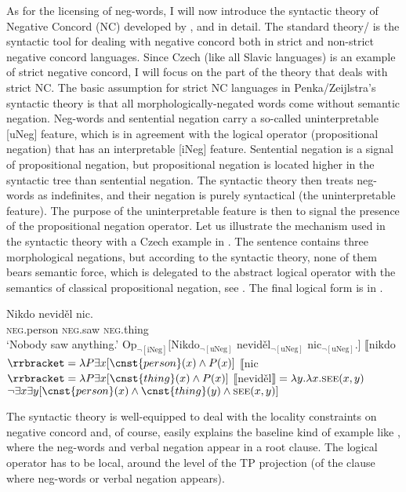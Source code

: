 \documentclass[output=paper,colorlinks,citecolor=brown]{langscibook}
\begin{document}
As for the licensing of neg-words, I will now introduce the syntactic theory of Negative Concord (NC) developed by \citet{zeijlstra2004sentential,penka2007negative}, and \citet{zeijlstra2008negative} in detail. The standard theory/\citet{zeijlstra2004sentential} is the syntactic tool for dealing with negative concord both in strict and non-strict negative concord languages. Since Czech (like all Slavic languages) is an example of strict negative concord, I will focus on the part of the theory that deals with strict NC. The basic assumption for strict NC languages in Penka/Zeijlstra's syntactic theory is that all morphologically-negated words come without semantic negation. Neg-words and sentential negation carry a so-called uninterpretable {[}uNeg{]} feature, which is in agreement with the logical operator (propositional negation) that has an interpretable {[}iNeg{]} feature.  Sentential negation is a signal of propositional negation, but propositional negation is located higher in the syntactic tree than sentential negation. The syntactic theory then treats neg-words as indefinites, and their negation is purely syntactical (the uninterpretable feature). The purpose of the uninterpretable feature is then to signal the presence of the propositional negation operator. Let us illustrate the mechanism used in the syntactic theory with a Czech example in . The sentence contains three morphological negations, but according to the syntactic theory, none of them bears semantic force, which is delegated to the abstract logical operator with the semantics of classical propositional negation, see . The final logical form is in .

\ea\ea\label{ex-neg-concord-a} \gll Nikdo neviděl nic.\\
\textsc{neg}.person \textsc{neg}.saw \textsc{neg}.thing\\
\glt `Nobody saw anything.'
\ea\label{ex-neg-concord-b} Op$_{\neg \mathrm{[iNeg]}}[$Nikdo$_{\neg \mathrm{[uNeg]}}$ neviděl$_{\neg \mathrm{[uNeg]}}$ nic$_{\neg \mathrm{[uNeg]}}$.$]$
\ex $\llbracket$nikdo$\rrbracket = \lambda P \exists x[\cnst{person}(x) \wedge P(x)]$ 
\ex $\llbracket$nic$\rrbracket = \lambda P \exists x[\cnst{thing}(x) \wedge P(x)]$
\ex $\llbracket$neviděl$\rrbracket = \lambda y.\lambda x.\textsc{see}(x,y)$\z
\ex\label{ex-neg-concord-c} $\neg \exists x \exists y[\cnst{person}(x) \wedge \cnst{thing}(y) \wedge \textsc{see}(x,y)]$\z\z

\noindent The syntactic theory is well-equipped to deal with the locality constraints on negative concord and, of course, easily explains the baseline kind of example like , where the neg-words and verbal negation appear in a root clause. The logical operator has to be local, around the level of the TP projection (of the clause where neg-words or verbal negation appears). 
\end{document}
